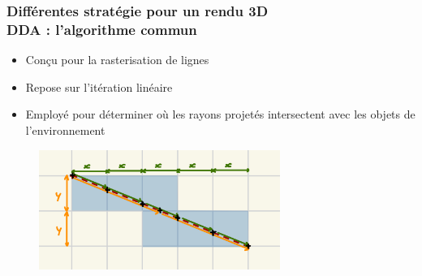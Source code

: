 \documentclass{beamer}
\begin{document}
\begin{frame}
    \frametitle{Différentes stratégie pour un rendu 3D \\
                \small DDA : l'algorithme commun}           
    \begin{block}{}
        \begin{itemize}
            \item Conçu pour la rasterisation de lignes
            \item Repose sur l'itération linéaire
            \item Employé pour déterminer où les rayons projetés intersectent avec les objets de l'environnement
        \end{itemize}
    \end{block}
    \begin{figure}
        \centering
        \includegraphics[width=0.7\textwidth]{images/DDA 0.jpg}
    \end{figure}
    
\end{frame}
\end{document}
